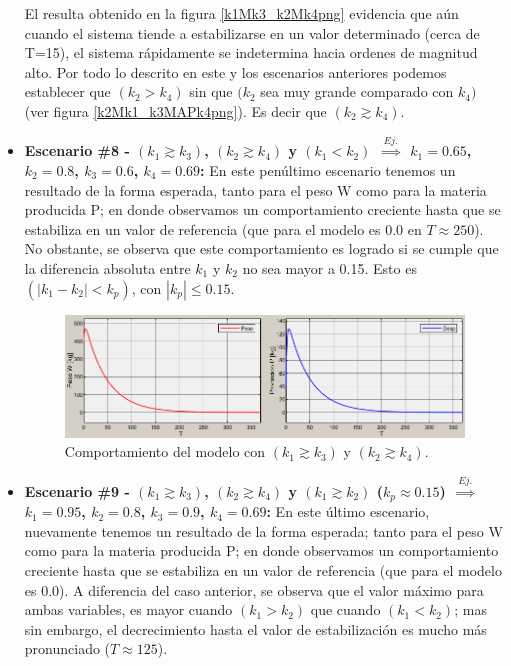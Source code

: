 \begin{itemize}
    El resulta obtenido en la figura \ref{k1Mk3_k2Mk4png} evidencia que aún cuando el sistema tiende a estabilizarse en un valor determinado (cerca de T=15), el sistema rápidamente se indetermina hacia ordenes de magnitud alto. Por todo lo descrito en este y los escenarios anteriores podemos establecer que $(k_{2} > k_{4})$ sin que $(k_{2}$ sea muy grande comparado con $k_{4})$ (ver figura \ref{k2Mk1_k3MAPk4png}). Es decir que $(k_{2} \gtrsim k_{4})$.
    
    \item \textbf{Escenario \#8 - $(k_{1}\gtrsim k_{3})$, $(k_{2}\gtrsim k_{4})$ y $(k_{1}<k_{2})$ $\overset{Ej.}{\implies}$ $k_{1}=0.65$, $k_{2}=0.8$, $k_{3}=0.6$, $k_{4}=0.69$:} En este penúltimo escenario tenemos un resultado de la forma esperada, tanto para el peso W como para la materia producida P; en donde observamos un comportamiento creciente hasta que se estabiliza en un valor de referencia (que para el modelo es 0.0 en $T\approx 250$). No obstante, se observa que este comportamiento es logrado si se cumple que la diferencia absoluta entre $k_{1}$ y $k_{2}$ no sea mayor a 0.15. Esto es $(|k_{1} - k_{2}| < k_{p})$, con $|k_{p}| \leq 0.15$.
    
            \begin{figure}[H]
        	   \centering
        	   \includegraphics[scale=0.75]{img/k1MAPk3_k2MAPk4.png}
        	   \caption{Comportamiento del modelo con $(k_{1}\gtrsim k_{3})$ y $(k_{2}\gtrsim k_{4})$. \label{kiMAPpng}}
            \end{figure}

    \item \textbf{Escenario \#9 - $(k_{1}\gtrsim k_{3})$, $(k_{2}\gtrsim k_{4})$ y $(k_{1}\gtrsim k_{2})$ ($k_{p}\approx0.15$) $\overset{Ej.}{\implies}$ $k_{1}=0.95$, $k_{2}=0.8$, $k_{3}=0.9$, $k_{4}=0.69$:}  En este último escenario, nuevamente tenemos un resultado de la forma esperada; tanto para el peso W como para la materia producida P; en donde observamos un comportamiento creciente hasta que se estabiliza en un valor de referencia (que para el modelo es 0.0). A diferencia del caso anterior, se observa que el valor máximo para ambas variables, es mayor cuando $(k_{1}>k_{2})$ que cuando $(k_{1}<k_{2})$; mas sin embargo, el decrecimiento hasta el valor de estabilización es mucho más pronunciado ($T\approx 125$).
    

\end{itemize}
